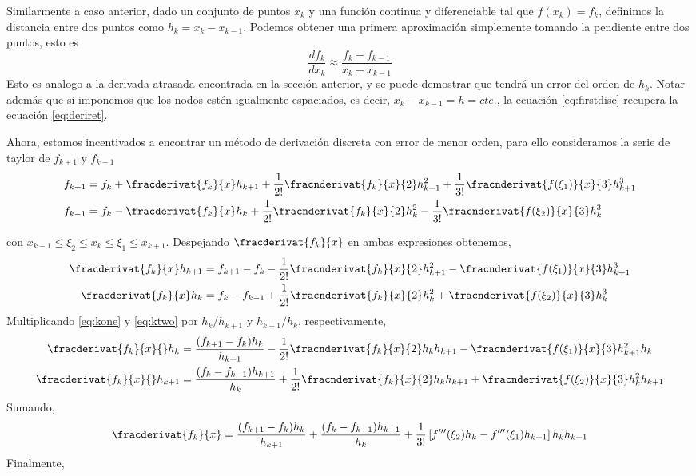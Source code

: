 Similarmente a caso anterior, dado un conjunto de puntos $x_{k}$ y una función continua y diferenciable tal que $f(x_{k}) = f_{k}$, definimos la distancia entre dos puntos como $h_{k} = x_{k} - x_{k-1}$. Podemos obtener una primera aproximación simplemente tomando la pendiente entre dos puntos, esto es
\begin{equation} \label{eq:firstdisc}
  \frac{df_{k}}{dx_{k}} \approx \frac{ f_{k}-f_{k-1}}{x_{k}-x_{k-1}}
\end{equation}
Esto es analogo a la derivada atrasada encontrada en la sección anterior, y se puede demostrar que tendrá un error del orden de $h_{k}$. Notar además que si imponemos que los nodos estén igualmente espaciados, es decir, $x_{k}-x_{k-1} = h = cte.$, la ecuación \eqref{eq:firstdisc} recupera la ecuación \eqref{eq:deriret}.

Ahora, estamos incentivados a encontrar un método de derivación discreta con error de menor orden, para ello consideramos la serie de taylor de $f_{k+1}$ y $f_{k-1}$ 
\begin{align}
  f_{k+1} &= f_{k} + \fracderivat{f_{k}}{x}h_{k+1} + \frac{1}{2!}\fracnderivat{f_{k}}{x}{2}h_{k+1}^{2} + \frac{1}{3!}\fracnderivat{f(\xi_{1})}{x}{3}h_{k+1}^{3} \label{eq:kplus} \\
    f_{k-1} &= f_{k} - \fracderivat{f_{k}}{x}h_{k} + \frac{1}{2!}\fracnderivat{f_{k}}{x}{2}h_{k}^{2} - \frac{1}{3!}\fracnderivat{f(\xi_{2})}{x}{3}h_{k}^{3} \label{eq:kmin}
\end{align}

con $x_{k-1} \leq \xi_{2} \leq x_{k} \leq \xi_{1} \leq x_{k+1}$. Despejando $\fracderivat{f_{k}}{x}$ en ambas expresiones obtenemos,
\begin{align}
  \fracderivat{f_{k}}{x}h_{k+1} &= f_{k+1} - f_{k} - \frac{1}{2!}\fracnderivat{f_{k}}{x}{2}h_{k+1}^{2} - \fracnderivat{f(\xi_{1})}{x}{3}h_{k+1}^{3} \label{eq:kone} \\
    \fracderivat{f_{k}}{x}h_{k} &= f_{k} - f_{k-1} + \frac{1}{2!}\fracnderivat{f_{k}}{x}{2}h_{k}^{2} + \fracnderivat{f(\xi_{2})}{x}{3}h_{k}^{3} \label{eq:ktwo}
\end{align}
Multiplicando \eqref{eq:kone} y \eqref{eq:ktwo} por $h_{k}/h_{k+1}$ y $h_{k+1}/h_{k}$, respectivamente, 
\begin{align}
  \fracderivat{f_{k}}{x}{}h_{k} &= \frac{(f_{k+1} - f_{k})h_{k}}{h_{k+1}} - \frac{1}{2!}\fracnderivat{f_{k}}{x}{2}h_{k}h_{k+1} - \fracnderivat{f(\xi_{1})}{x}{3}h_{k+1}^{2}h_{k} \\
    \fracderivat{f_{k}}{x}{}h_{k+1} &= \frac{(f_{k} - f_{k-1})h_{k+1}}{h_{k}} + \frac{1}{2!}\fracnderivat{f_{k}}{x}{2}h_{k}h_{k+1} + \fracnderivat{f(\xi_{2})}{x}{3}h_{k}^{2}h_{k+1}
\end{align}
Sumando,
\begin{equation}
  [h_{k+1} + h_{k}]\fracderivat{f_{k}}{x} = \frac{(f_{k+1} - f_{k})h_{k}}{h_{k+1}} + \frac{(f_{k} - f_{k-1})h_{k+1}}{h_{k}} + \frac{1}{3!} \left[ f^{\prime \prime \prime}(\xi_{2})h_{k} - f^{\prime \prime \prime}(\xi_{1})h_{k+1} \right]h_{k}h_{k+1}
\end{equation}
Finalmente,

